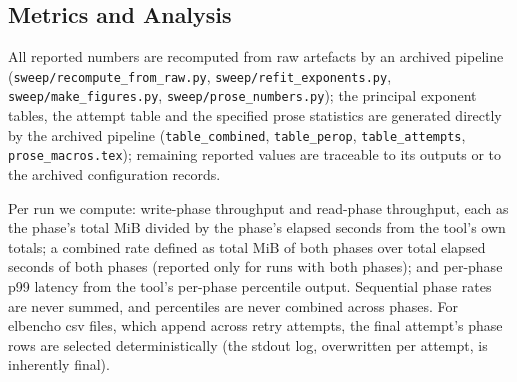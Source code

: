 \documentclass[manuscript,screen,review]{acmart}
\begin{document}
\begin{table}
\caption{As-executed configuration summary (full table with sources and
unrecoverable items marked is in the archive: configs/AS\_EXECUTED\_CONFIG.md).
NIC limits are provider-documented figures for the SKU, not measurements; the
replication protocol adds a measured per-host network baseline.}
\label{tab:config}
\end{table}

\subsection{Metrics and Analysis}\label{sec:metrics}
{\sloppy All reported numbers are recomputed from raw artefacts by an
archived pipeline (\texttt{sweep/recompute\_from\_raw.py},
\texttt{sweep/refit\_exponents.py}, \texttt{sweep/make\_figures.py},
\texttt{sweep/prose\_numbers.py}); the principal exponent tables, the attempt table and the specified prose
statistics are generated directly by the archived pipeline
(\texttt{table\_combined}, \texttt{table\_perop},
\texttt{table\_attempts}, \texttt{prose\_macros.tex}); remaining reported
values are traceable to its outputs or to the archived configuration
records.\par} Per run we compute: write-phase throughput and read-phase throughput,
each as the phase's total MiB divided by the phase's elapsed seconds from the
tool's own totals; a combined rate defined as total MiB of both phases over
total elapsed seconds of both phases (reported only for runs with both
phases); and per-phase p99 latency from the tool's per-phase percentile
output. Sequential phase rates are never summed, and percentiles are never
combined across phases. For elbencho csv files, which append across retry
attempts, the final attempt's phase rows are selected deterministically (the
stdout log, overwritten per attempt, is inherently final).
\end{document}
